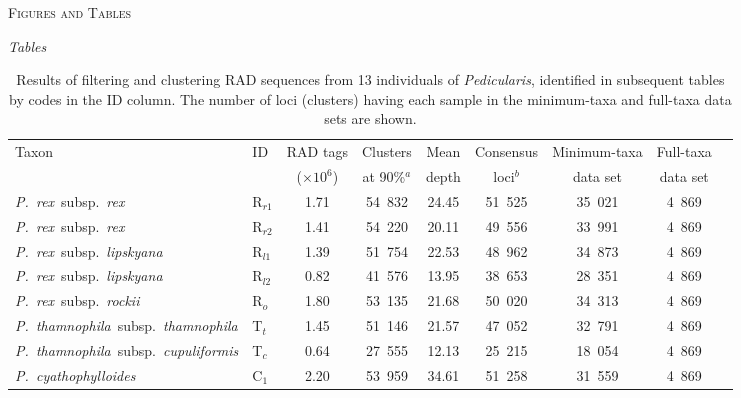 \documentclass[12pt,letterpaper]{article}
\renewcommand{\section}[1]{%
\bigskip
\begin{center}
\begin{Large}
\normalfont\scshape #1
\medskip
\end{Large}
\end{center}}
\renewcommand{\subsection}[1]{%
\bigskip
\begin{center}
\begin{large}
\normalfont\itshape #1
\end{large}
\end{center}}
\providecommand{\e}[1]{\ensuremath{\times 10^{#1}}}
\begin{document}
\section{Figures and Tables}
\subsection{Tables}

\begin{sidewaystable}
  \caption{Results of filtering and clustering RAD sequences from 13
    individuals of \emph{Pedicularis}, identified in subsequent tables
    by codes in the ID column. The number of loci (clusters) having
    each sample in the minimum-taxa and full-taxa data sets are
    shown.}
\label{tab:1}
\begin{center}
\begin{tabular*}{1.0\textwidth}{@{\extracolsep{\fill}}llccccccc}
\hline
\multirow{2}{*}{Taxon}   &\multirow{2}{*}{ID}   & RAD tags       & Clusters   &  Mean     & Consensus & Minimum-taxa & Full-taxa \\
                         &                      & (\e{6})        &  at 90\%\ensuremath{^{a}}   & depth   & loci\ensuremath{^{b}}  & data set & data set  \\ 
\hline
\hline
\emph{P.~rex}~subsp.\ \emph{rex}                   &R$_{r1}$   &1.71   & 54~832   &24.45   &51~525  &35~021   &  4~869 \\  %
\emph{P.~rex}~subsp.\ \emph{rex}                   &R$_{r2}$   &1.41   & 54~220   &20.11   &49~556  &33~991   &  4~869 \\  %
\emph{P.~rex}~subsp.\ \emph{lipskyana}             &R$_{l1}$   &1.39   & 51~754   &22.53   &48~962  &34~873   &  4~869 \\  %
\emph{P.~rex}~subsp.\ \emph{lipskyana}             &R$_{l2}$   &0.82   & 41~576   &13.95   &38~653  &28~351   &  4~869 \\  %
\emph{P.~rex}~subsp.\ \emph{rockii}                &R$_{o}$    &1.80   & 53~135   &21.68   &50~020  &34~313   &  4~869\\   %
\emph{P.~thamnophila}~subsp.\ \emph{thamnophila}   &T$_t$      &1.45   & 51~146   &21.57   &47~052  &32~791   &  4~869 \\  %
\emph{P.~thamnophila}~subsp.\ \emph{cupuliformis}  &T$_c$      &0.64   & 27~555   &12.13   &25~215  &18~054   &  4~869 \\  %
\emph{P.~cyathophylloides}                        &C$_1$      &2.20   & 53~959   &34.61   &51~258  &31~559   &  4~869 \\  %

\end{tabular*}
\end{center}
\end{sidewaystable}
\end{document}

